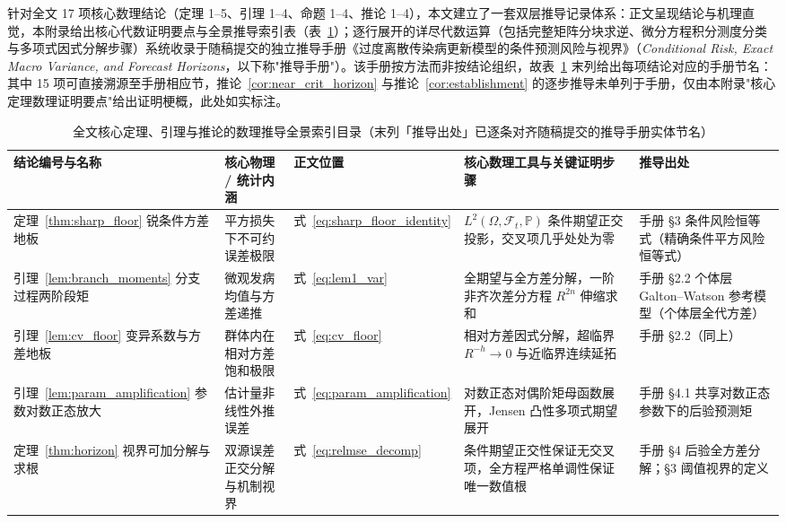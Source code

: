 \documentclass[11pt,a4paper]{article}
\theoremstyle{plain}
\theoremstyle{definition}
\begin{document}
针对全文 17 项核心数理结论（定理 1--5、引理 1--4、命题 1--4、推论 1--4），本文建立了一套双层推导记录体系：正文呈现结论与机理直觉，本附录给出核心代数证明要点与全景推导索引表（表~\ref{tab:derivation_roadmap}）；逐行展开的详尽代数运算（包括完整矩阵分块求逆、微分方程积分测度分类与多项式因式分解步骤）系统收录于随稿提交的独立推导手册《过度离散传染病更新模型的条件预测风险与视界》（\textit{Conditional Risk, Exact Macro Variance, and Forecast Horizons}，以下称"推导手册"）。该手册按方法而非按结论组织，故表~\ref{tab:derivation_roadmap} 末列给出每项结论对应的手册节名：其中 15 项可直接溯源至手册相应节，推论~\ref{cor:near_crit_horizon} 与推论~\ref{cor:establishment} 的逐步推导未单列于手册，仅由本附录"核心定理数理证明要点"给出证明梗概，此处如实标注。

\begin{table}[htbp]
\centering
\fontsize{7.0pt}{8.4pt}\selectfont
\setlength{\tabcolsep}{2.0pt}
\caption{全文核心定理、引理与推论的数理推导全景索引目录（末列「推导出处」已逐条对齐随稿提交的推导手册实体节名）}\label{tab:derivation_roadmap}
\begin{tabular}{@{}>{\raggedright\arraybackslash}p{2.3cm}>{\raggedright\arraybackslash}p{2.6cm}>{\raggedright\arraybackslash}p{1.6cm}>{\raggedright\arraybackslash}p{4.6cm}>{\raggedright\arraybackslash}p{3.4cm}@{}}
\toprule
结论编号与名称 & 核心物理 / 统计内涵 & 正文位置 & 核心数理工具与关键证明步骤 & 推导出处 \\
\midrule
定理~\ref{thm:sharp_floor} 锐条件方差地板 & 平方损失下不可约误差极限 & 式~\eqref{eq:sharp_floor_identity} & $L^2(\Omega,\mathcal{F}_t,\mathbb{P})$ 条件期望正交投影，交叉项几乎处处为零 & 手册 §3 条件风险恒等式（精确条件平方风险恒等式） \\
\addlinespace[3pt]
引理~\ref{lem:branch_moments} 分支过程两阶段矩 & 微观发病均值与方差递推 & 式~\eqref{eq:lem1_var} & 全期望与全方差分解，一阶非齐次差分方程 $R^{2n}$ 伸缩求和 & 手册 §2.2 个体层 Galton--Watson 参考模型（个体层全代方差） \\
\addlinespace[3pt]
引理~\ref{lem:cv_floor} 变异系数与方差地板 & 群体内在相对方差饱和极限 & 式~\eqref{eq:cv_floor} & 相对方差因式分解，超临界 $R^{-h}\to0$ 与近临界连续延拓 & 手册 §2.2（同上） \\
\addlinespace[3pt]
引理~\ref{lem:param_amplification} 参数对数正态放大 & 估计量非线性外推误差 & 式~\eqref{eq:param_amplification} & 对数正态对偶阶矩母函数展开，Jensen 凸性多项式期望展开 & 手册 §4.1 共享对数正态参数下的后验预测矩 \\
\addlinespace[3pt]
定理~\ref{thm:horizon} 视界可加分解与求根 & 双源误差正交分解与机制视界 & 式~\eqref{eq:relmse_decomp} & 条件期望正交性保证无交叉项，全方程严格单调性保证唯一数值根 & 手册 §4 后验全方差分解；§3 阈值视界的定义 \\

\end{tabular}
\end{table}
\end{document}
